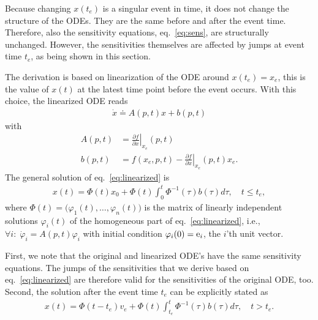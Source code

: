 \documentclass[journal, a4paper]{IEEEtran}
\begin{document}
Because changing $x(t_e)$ is a singular event in time, it does not change the structure of the ODEs. They are the same before and after the event time. Therefore, also the sensitivity equations, eq.~\eqref{eq:sens}, are structurally unchanged. However, the sensitivities themselves are affected by jumps at event time $t_e$, as being shown in this section.

The derivation is based on linearization of the ODE around $x(t_e) = x_e$, this is the value of $x(t)$ at the latest time point before the event occurs. With this choice, the linearized ODE reads
\begin{align}
    \dot x \doteq A(p, t) x + b(p, t)
    \label{eq:linearized}
\end{align}
with
\begin{align*}
A(p, t) &= \left.\frac{\partial f}{\partial x}\right|_{x_e}(p, t)\\
b(p, t) &= f(x_e, p, t)- \left.\frac{\partial f}{\partial x}\right|_{x_e}(p, t)x_e.
\end{align*}
The general solution of eq.~\eqref{eq:linearized} is
\begin{align}
    x(t) = \Phi(t)x_0 + \Phi(t)\int_0^t \Phi^{-1}(\tau)b(\tau)d\tau,\quad t\leq t_e,
    \label{eq:leqte}
\end{align}
where $\Phi(t) = \big(\varphi_1(t), \dots, \varphi_n(t)\big)$ is the matrix of linearly independent solutions $\varphi_i(t)$ of the homogeneous part of eq.~\eqref{eq:linearized}, i.e., $\forall i:\;\dot\varphi_i = A(p, t)\varphi_i$ with initial condition $\varphi_i(0) = {\rm e}_i$, the $i$'th unit vector.

First, we note that the original and linearized ODE's have the same sensitivity equations. The jumps of the sensitivities that we derive based on eq.~\eqref{eq:linearized} are therefore valid for the sensitivities of the original ODE, too. Second, the solution after the event time $t_e$ can be explicitly stated as
\begin{align}
    x(t) = \Phi(t-t_e)v_e + \Phi(t)\int_{t_e}^{t}\Phi^{-1}(\tau)b(\tau)d\tau,\quad t > t_e.
    \label{eq:gte}
\end{align}
\end{document}
